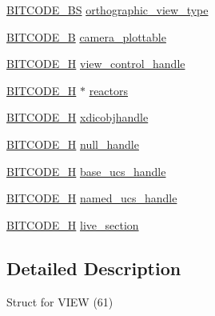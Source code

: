 \begin{DoxyCompactItemize}
\item 
\hyperlink{dwg_8h_a94297606fbd4a4ff97e8add284af0809}{\-B\-I\-T\-C\-O\-D\-E\-\_\-\-B\-S} \hyperlink{struct__dwg__object__VIEW_a0549573187e956957bfb29b25c10b656}{orthographic\-\_\-view\-\_\-type}
\item 
\hyperlink{dwg_8h_ab533b1f62d9086749e3bb5b67e9f224e}{\-B\-I\-T\-C\-O\-D\-E\-\_\-\-B} \hyperlink{struct__dwg__object__VIEW_aa4f81fea2bca3fd498b28908f1399138}{camera\-\_\-plottable}
\item 
\hyperlink{dwg_8h_a7c700e94e047a97ba8c24bdfe4029dc3}{\-B\-I\-T\-C\-O\-D\-E\-\_\-\-H} \hyperlink{struct__dwg__object__VIEW_a934496e0a283477a2d0fc94d3602bdf3}{view\-\_\-control\-\_\-handle}
\item 
\hyperlink{dwg_8h_a7c700e94e047a97ba8c24bdfe4029dc3}{\-B\-I\-T\-C\-O\-D\-E\-\_\-\-H} $\ast$ \hyperlink{struct__dwg__object__VIEW_aaddacda40b9a8179367a5a02cfca96e2}{reactors}
\item 
\hyperlink{dwg_8h_a7c700e94e047a97ba8c24bdfe4029dc3}{\-B\-I\-T\-C\-O\-D\-E\-\_\-\-H} \hyperlink{struct__dwg__object__VIEW_a79b5b547b676e5127e0dbf9c756bfcc4}{xdicobjhandle}
\item 
\hyperlink{dwg_8h_a7c700e94e047a97ba8c24bdfe4029dc3}{\-B\-I\-T\-C\-O\-D\-E\-\_\-\-H} \hyperlink{struct__dwg__object__VIEW_aae8df999e9c9117998b03a753b429d0d}{null\-\_\-handle}
\item 
\hyperlink{dwg_8h_a7c700e94e047a97ba8c24bdfe4029dc3}{\-B\-I\-T\-C\-O\-D\-E\-\_\-\-H} \hyperlink{struct__dwg__object__VIEW_ae5d12adfce19567d5f7e931700a983e2}{base\-\_\-ucs\-\_\-handle}
\item 
\hyperlink{dwg_8h_a7c700e94e047a97ba8c24bdfe4029dc3}{\-B\-I\-T\-C\-O\-D\-E\-\_\-\-H} \hyperlink{struct__dwg__object__VIEW_a96edb21eab8d00ed413bca4b7816e014}{named\-\_\-ucs\-\_\-handle}
\item 
\hyperlink{dwg_8h_a7c700e94e047a97ba8c24bdfe4029dc3}{\-B\-I\-T\-C\-O\-D\-E\-\_\-\-H} \hyperlink{struct__dwg__object__VIEW_a4ee699752c4dd73174e48615cfee62af}{live\-\_\-section}
\end{DoxyCompactItemize}


\subsection{\-Detailed \-Description}
\-Struct for \-V\-I\-E\-W (61) 

